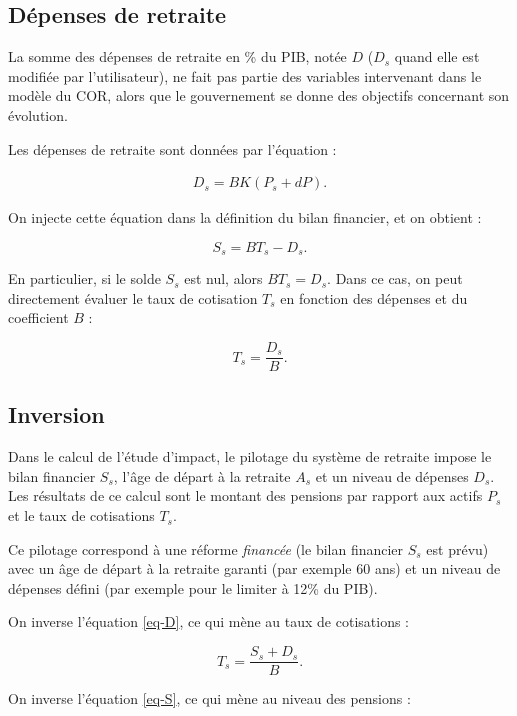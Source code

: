 \documentclass[10pt]{article}
\begin{document}

\subsection{Dépenses de retraite}

La somme des dépenses de retraite en \% du PIB, notée $D$ ($D_s$ quand elle est modifiée par l'utilisateur), ne fait pas partie des variables intervenant dans le modèle du COR, alors que le gouvernement se donne des objectifs concernant son évolution.

Les dépenses de retraite sont données par l'équation :

\begin{eqnarray}
D_s =  B K(P_s + dP). \label{eq-D}
\end{eqnarray}

On injecte cette équation dans la définition du bilan financier, et on obtient :

$$
S_s =  B T_s - D_s.
$$

En particulier, si le solde $S_s$ est nul, alors 
$B T_s = D_s$.
Dans ce cas, on peut directement évaluer le taux de cotisation 
$T_s$ en fonction des dépenses et du coefficient $B$ :

$$
T_s = \frac{D_s}{B}.
$$


\subsection{Inversion}
\label{section-inversion}

Dans le calcul de l'étude d'impact, le pilotage du système de retraite impose 
le bilan financier $S_s$, l'âge de départ à la retraite $A_s$ et 
un niveau de dépenses $D_s$. 
Les résultats de ce calcul sont le montant des pensions par rapport aux actifs $P_s$ et le taux de cotisations $T_s$.

Ce pilotage correspond à une réforme \emph{financée} 
(le bilan financier $S_s$ est prévu) avec un âge de départ 
à la retraite garanti (par exemple 60 ans) et un niveau de 
dépenses défini (par exemple pour le limiter à 12\% du PIB).

On inverse l'équation \ref{eq-D}, ce qui mène au taux de cotisations :

$$
T_s = \frac{S_s + D_s}{B}.
$$

On inverse l'équation \ref{eq-S}, ce qui mène au niveau des pensions :
\end{document}
